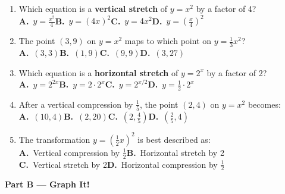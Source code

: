 \documentclass[12pt]{article}
\begin{document}
\begin{enumerate}[label=\textbf{BM\arabic*.},leftmargin=*,itemsep=14pt]

\item Which equation is a \textbf{vertical stretch} of $y=x^2$ by a factor of 4?\\[5pt]
\textbf{A.}\ $y=\tfrac{x^2}{4}$\qquad \textbf{B.}\ $y=(4x)^2$\qquad \textbf{C.}\ $y=4x^2$\qquad \textbf{D.}\ $y=\left(\tfrac{x}{4}\right)^2$

\item The point $(3,9)$ on $y=x^2$ maps to which point on $y=\tfrac{1}{3}x^2$?\\[5pt]
\textbf{A.}\ $(3,3)$\qquad \textbf{B.}\ $(1,9)$\qquad \textbf{C.}\ $(9,9)$\qquad \textbf{D.}\ $(3,27)$

\item Which equation is a \textbf{horizontal stretch} of $y=2^x$ by a factor of 2?\\[5pt]
\textbf{A.}\ $y=2^{2x}$\qquad \textbf{B.}\ $y=2\cdot2^x$\qquad \textbf{C.}\ $y=2^{x/2}$\qquad \textbf{D.}\ $y=\tfrac{1}{2}\cdot2^x$

\item After a vertical compression by $\tfrac{1}{5}$, the point $(2,4)$ on $y=x^2$ becomes:\\[5pt]
\textbf{A.}\ $(10,4)$\qquad \textbf{B.}\ $(2,20)$\qquad \textbf{C.}\ $\left(2,\tfrac{4}{5}\right)$\qquad \textbf{D.}\ $\left(\tfrac{2}{5},4\right)$

\item The transformation $y=\left(\tfrac{1}{2}x\right)^2$ is best described as:\\[5pt]
\textbf{A.}\ Vertical compression by $\tfrac{1}{2}$\qquad \textbf{B.}\ Horizontal stretch by 2\\[3pt]
\textbf{C.}\ Vertical stretch by 2\qquad \textbf{D.}\ Horizontal compression by $\tfrac{1}{2}$

\end{enumerate}

\vspace{0.8em}
\noindent\textbf{\large Part B --- Graph It!}
\vspace{0.4em}
\end{document}
